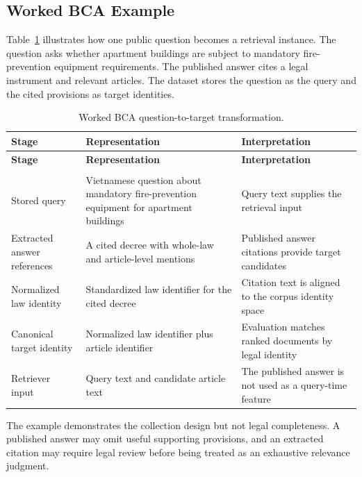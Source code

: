 \subsection{Worked BCA Example}

Table~\ref{tab:4.2} illustrates how one public question becomes a retrieval instance. The question asks whether apartment buildings are subject to mandatory fire-prevention equipment requirements. The published answer cites a legal instrument and relevant articles. The dataset stores the question as the query and the cited provisions as target identities.

\begingroup
\small
\setlength{\tabcolsep}{3pt}
\renewcommand{\arraystretch}{1.18}
\begin{longtable}{>{\raggedright\arraybackslash}p{3.429cm}>{\raggedright\arraybackslash}p{5.828cm}>{\raggedright\arraybackslash}p{6.084cm}}
\caption[Worked BCA question-to-target transformation.]{Worked BCA question-to-target transformation.}\label{tab:4.2}\\
\toprule
\textbf{Stage} & \textbf{Representation} & \textbf{Interpretation} \\
\midrule
\endfirsthead
\toprule
\textbf{Stage} & \textbf{Representation} & \textbf{Interpretation} \\
\midrule
\endhead
\midrule
\multicolumn{3}{r}{\footnotesize Continued on next page}\\
\endfoot
\bottomrule
\endlastfoot
Stored query & Vietnamese question about mandatory fire-prevention equipment for apartment buildings & Query text supplies the retrieval input \\
Extracted answer references & A cited decree with whole-law and article-level mentions & Published answer citations provide target candidates \\
Normalized law identity & Standardized law identifier for the cited decree & Citation text is aligned to the corpus identity space \\
Canonical target identity & Normalized law identifier plus article identifier & Evaluation matches ranked documents by legal identity \\
Retriever input & Query text and candidate article text & The published answer is not used as a query-time feature \\
\end{longtable}
\endgroup

The example demonstrates the collection design but not legal completeness. A published answer may omit useful supporting provisions, and an extracted citation may require legal review before being treated as an exhaustive relevance judgment.

